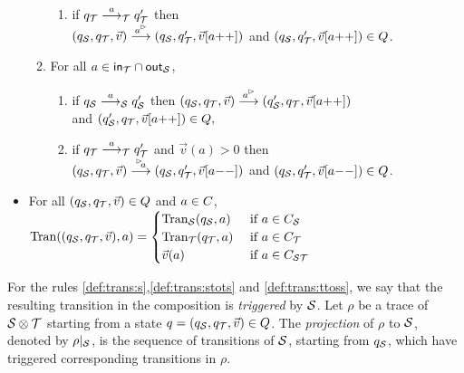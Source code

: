\begin{definition}
\begin{itemize}
\begin{enumerate}[label=\arabic*:, ref=(\arabic*), leftmargin=*]
\begin{enumerate}[label=3.\arabic*:, ref=(3.\arabic*), leftmargin=*]
                    \item\label{def:trans:stott} if $q_\T \goes{a}_\T q'_\T$ then \\ $(q_\S, q_\T, \vec{v}) \goes{\outact{a}} (q_\S, q'_\T, \vec{v}[a\mathrm{++}])$
and $(q_\S, q'_\T, \vec{v}[a\mathrm{++}]) \in Q$.
                \end{enumerate}
\vspace{1mm}
        \item\label{def:trans:ttos} For all $a \in \inset_\T \cap \outset_\S$,
                \begin{enumerate}[label=4.\arabic*:, ref=(4.\arabic*), leftmargin=*]
                    \item\label{def:trans:ttoss} if $q_\S \goes{a}_\S q'_\S$ then $(q_\S, q_\T, \vec{v}) \goes{\outact{a}} (q'_\S, q_\T, \vec{v}[a\mathrm{++}])$\\
and $(q'_\S, q_\T, \vec{v}[a\mathrm{++}]) \in Q,$
                    \item\label{def:trans:ttost} if $q_\T \goes{a}_\T q'_\T$ and $\vec v (a) > 0$
then\\ $(q_\S, q_\T, \vec{v}) \goes{\inact{a}} (q_\S, q'_\T, \vec{v}[a\mathrm{--}])$
and $(q_\S, q'_\T, \vec{v}[a\mathrm{--}]) \in Q$.
                \end{enumerate}        
    \end{enumerate}
\vspace{1mm}
    \item For all $(q_\S,q_\T,\vec{v}) \in Q$ and $a \in \chan$, \\
    $ 
    \val ((q_\S,q_\T,\vec{v}),a) =
    \begin{cases}
        \val_\S(q_\S,a) &\text{ if } a \in \chan_\S \\
        \val_\T(q_\T,a) &\text{ if } a \in \chan_\T \\
        \vec{v}(a)        &\text{ if } a \in \chan_{\S\T}
    \end{cases} \qquad $ 
\end{itemize}
For the rules \ref{def:trans:s},\ref{def:trans:stots} and \ref{def:trans:ttoss}, we say that the resulting transition in the composition is \emph{triggered} by $\S$.
Let $\rho$ be a trace of $\S\compos\T$ starting from a state $q = (q_\S,q_\T,\vec{v}) \in Q$. The \emph{projection} of $\rho$ to $\S$, denoted by $\rho|_\S$, is the sequence of transitions of $\S$, starting from $q_\S$, which have triggered corresponding transitions in $\rho$.

\end{definition}

